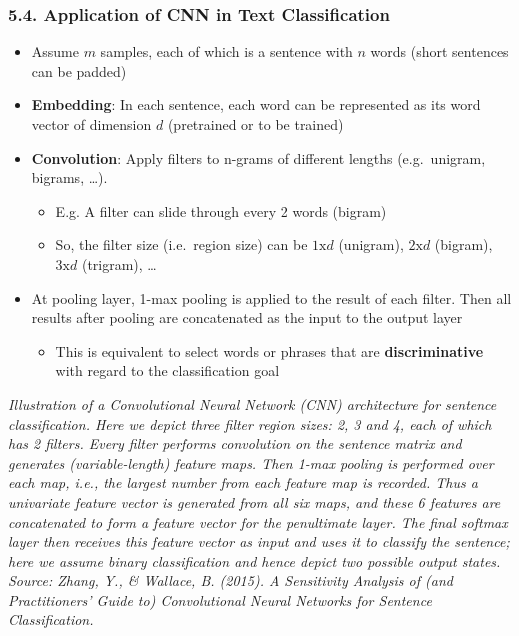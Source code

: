 \documentclass[11pt]{article}
\providecommand{\tightlist}{%
      \setlength{\itemsep}{0pt}\setlength{\parskip}{0pt}}
\begin{document}
    \hypertarget{application-of-cnn-in-text-classification}{%
\subsubsection{5.4. Application of CNN in Text
Classification}\label{application-of-cnn-in-text-classification}}

\begin{itemize}
\tightlist
\item
  Assume \(m\) samples, each of which is a sentence with \(n\) words
  (short sentences can be padded)
\item
  \textbf{Embedding}: In each sentence, each word can be represented as
  its word vector of dimension \(d\) (pretrained or to be trained)
\item
  \textbf{Convolution}: Apply filters to n-grams of different lengths
  (e.g.~unigram, bigrams, \ldots{}).

  \begin{itemize}
  \tightlist
  \item
    E.g. A filter can slide through every 2 words (bigram)
  \item
    So, the filter size (i.e.~region size) can be \(1\text{x}d\)
    (unigram), \(2\text{x}d\) (bigram), \(3\text{x}d\) (trigram),
    \ldots{}
  \end{itemize}
\item
  At pooling layer, 1-max pooling is applied to the result of each
  filter. Then all results after pooling are concatenated as the input
  to the output layer

  \begin{itemize}
  \tightlist
  \item
    This is equivalent to select words or phrases that are
    \textbf{discriminative} with regard to the classification goal
  \end{itemize}
\end{itemize}

\emph{Illustration of a Convolutional Neural Network (CNN) architecture
for sentence classification. Here we depict three filter region sizes:
2, 3 and 4, each of which has 2 filters. Every filter performs
convolution on the sentence matrix and generates (variable-length)
feature maps. Then 1-max pooling is performed over each map, i.e., the
largest number from each feature map is recorded. Thus a univariate
feature vector is generated from all six maps, and these 6 features are
concatenated to form a feature vector for the penultimate layer. The
final softmax layer then receives this feature vector as input and uses
it to classify the sentence; here we assume binary classification and
hence depict two possible output states. Source: Zhang, Y., \& Wallace,
B. (2015). A Sensitivity Analysis of (and Practitioners' Guide to)
Convolutional Neural Networks for Sentence Classification.}
\end{document}
